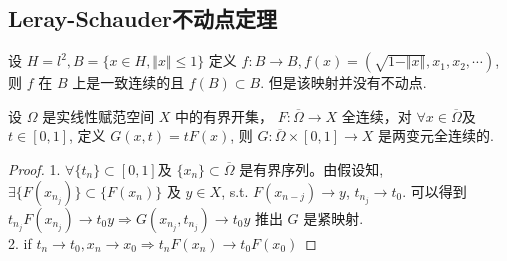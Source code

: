 \documentclass[a4,10pt]{ctexart}
\begin{document}
\subsection{Leray-Schauder不动点定理}

\begin{lt}
设 $H=l^2, B=\{x\in{H}, \Vert{x}\Vert\le{1}\}$ 定义 $f:B\to{B}, f(x)=\left(\sqrt{1-\Vert{x}\Vert},x_1, x_2,\cdots\right)$, 则 $f$ 在 $B$ 上是一致连续的且 $f(B)\subset{B}$. 但是该映射并没有不动点.
\end{lt}

\begin{yl}
  设 $\Omega$ 是实线性赋范空间 $X$ 中的有界开集， $F:\overline{\Omega}\to{X}$ 全连续，对 $\forall{x}\in\overline{\Omega}$及 $t\in[0,1]$, 定义 $G(x,t)=tF(x)$, 则 $G:\overline{\Omega}\times[0,1]\to{X}$ 是两变元全连续的.
\end{yl}

\begin{proof}
  1. $\forall\{t_n\}\subset[0,1]$及 $\{x_n\}\subset\overline{\Omega}$ 是有界序列。由假设知, $\exists\{F(x_{n_j})\}\subset\{F(x_n)\}$ 及 $y\in{X}$, s.t. $F(x_{n-j})\to{y}$, $t_{n_j}\to{t_0}$.
可以得到 $t_{n_j}F(x_{n_j})\to{t_0y} \Rightarrow G(x_{n_j},t_{n_j})\to{t_0y}$
推出 $G$ 是紧映射.\\
2. if $t_n\to{t_0}, x_n\to{x_0}\Rightarrow t_nF(x_n)\to{t_0F(x_0)}$
\end{proof}
\end{document}
